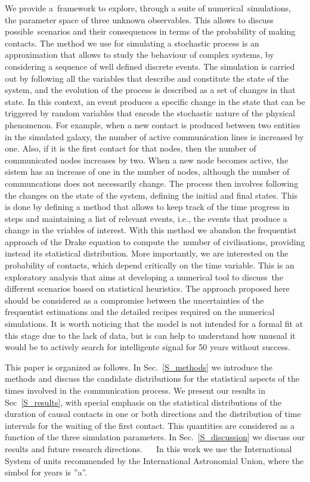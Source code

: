 \documentclass[crop]{CSLB}
\begin{document}
We provide a framework to explore, through a suite of numerical simulations,
the parameter space of three unknown observables.
%
This allows to discuss possible scenarios and their consequences in terms of
the probability of making contacts.
%
The method we use for simulating a stochastic process is an approximation that
allows to study the behaviour of complex systems, by considering a sequence of
well defined discrete events.
%
The simulation is carried out by following all the variables that describe and
constitute the state of the system, and the evolution of the process is
described as a set of changes in that state.
%
In this context, an event produces a specific change in the state that can be
triggered by random variables that encode the stochastic nature of the physical
phenomenon.
%
For example, when a new contact is produced between two entities in the
simulated galaxy, the number of active communication lines is increased by one.
%
Also, if it is the first contact for that nodes, 
then the number of communicated nodes increases by two.
%
When a new node becomes active, the sistem has an increase of one
in the number of nodes, although the number of communcations does not
necessarily change.
%
The process then involves following the changes on the state of the system, defining
the initial and final states.
%
This is done by defining a method that allows to keep track of the time
progress in steps and maintaining a list of relevant events, i.e., the events
that produce a change in the vriables of interest.
%
With this method we abandon the frequentist approach of the Drake equation to
compute the number of civilisations, providing instead its statistical
distribution.
%
More importantly, we are interested on the probability of contacts, which
depend critically on the time variable.
%
This is an exploratory analysis that aims at developing a numerical tool to
discuss the different scenarios based on statistical heuristics.
%
The approach proposed here should be considered as a compromise between the
uncertainties of the frequentist estimations and the detailed recipes required
on the numerical simulations.
%
It is worth noticing that the model is not intended for a formal fit at this
stage due to the lack of data, but is can help to understand how unusual it
would be to actively search for intelligente signal for 50 years without
success.


This paper is organized as follows.
%
In Sec.~\ref{S_methods} we introduce the methods and discuss the candidate
distributions for the statistical aspects of the times involved in the
communication process.
%
We present our results in Sec~\ref{S_results}, with special emphasis on the
statistical distributions of the duration of causal contacts in one or both
directions and the distribution of time intervals for the waiting of the first
contact.
%
This quantities are considered as a function of the three simulation
parameters.
%
In Sec.~\ref{S_discussion} we discuss our results and future research
directions.   
%
In this work we use the International System of units recommended by the
International Astronomial Union, where the simbol for years is ''a''.
\end{document}
